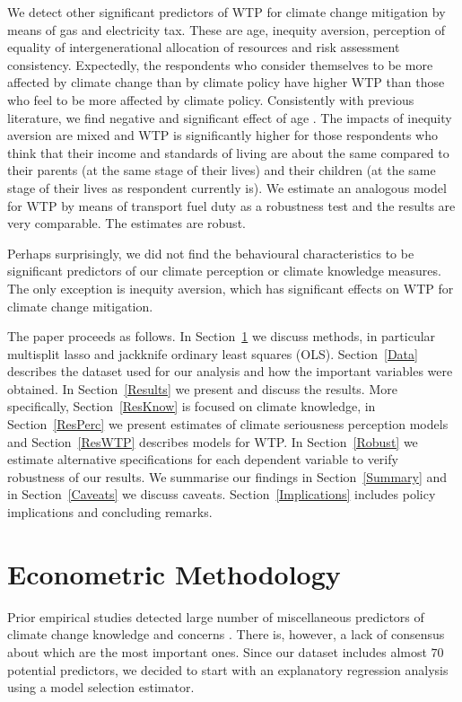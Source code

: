 \documentclass[a4paper,12pt]{article}
\begin{document}
We detect other significant predictors of WTP for climate change mitigation by means of gas and electricity tax. These are age, inequity aversion, perception of equality of intergenerational allocation of resources and risk assessment consistency. Expectedly, the respondents who consider themselves to be more affected by climate change than by climate policy have higher WTP than those who feel to be more affected by climate policy. Consistently with previous literature, we find negative and significant effect of age \citep{Hamilton2011, Kellstedt2008, Hayes2001gender}. The impacts of inequity aversion are mixed and WTP is significantly higher for those respondents who think that their income and standards of living are about the same compared to their parents (at the same stage of their lives) and their children (at the same stage of their lives as respondent currently is). We estimate an analogous model for WTP by means of transport fuel duty as a robustness test and the results are very comparable. The estimates are robust.


Perhaps surprisingly, we did not find the behavioural characteristics to be significant predictors of our climate perception or climate knowledge measures. The only exception is inequity aversion, which has significant effects on WTP for climate change mitigation.




The paper proceeds as follows. In Section~\ref{Method} we discuss methods, in particular multisplit lasso and jackknife ordinary least squares (OLS). Section~\ref{Data} describes the dataset used for our analysis and how the important variables were obtained. In Section~\ref{Results} we present and discuss the results. More specifically, Section~\ref{ResKnow} is focused on climate knowledge, in Section~\ref{ResPerc} we present estimates of climate seriousness perception models and Section~\ref{ResWTP} describes models for WTP. In Section~\ref{Robust} we estimate alternative specifications for each dependent variable to verify robustness of our results. We summarise our findings in Section~\ref{Summary} and in Section~\ref{Caveats} we discuss caveats. Section~\ref{Implications} includes policy implications and concluding remarks.


\FloatBarrier
\section{Econometric Methodology}\label{Method}

Prior empirical studies detected large number of miscellaneous predictors of climate change knowledge and concerns \citetext{e.g. \citealt*{Leiserowitz2015, Hamilton2011, McCright2010, Morrison2015}}. There is, however, a lack of consensus about which are the most important ones. Since our dataset includes almost $70$ potential predictors, we decided to start with an explanatory regression analysis using a model selection estimator.
\end{document}
